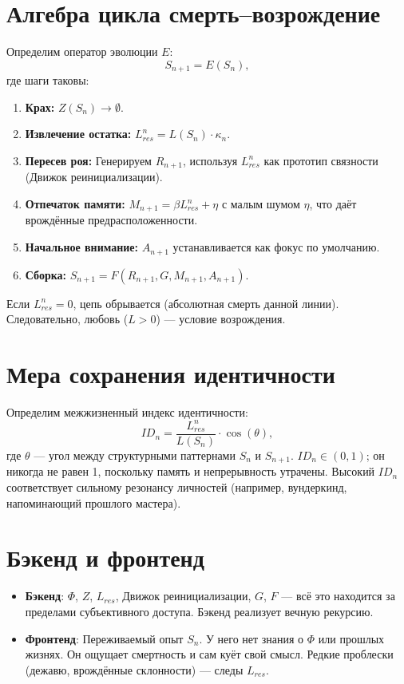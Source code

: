 \documentclass[12pt]{article}
\begin{document}
\section{Алгебра цикла смерть–возрождение}

Определим оператор эволюции $E$:
\[
S_{n+1} = E(S_n),
\]
где шаги таковы:
\begin{enumerate}
\item \textbf{Крах:} $Z(S_n) \to \emptyset$.
\item \textbf{Извлечение остатка:} $L_{res}^n = L(S_n)\cdot \kappa_n$.
\item \textbf{Пересев роя:} Генерируем $R_{n+1}$, используя $L_{res}^n$ как прототип связности (Движок реинициализации).
\item \textbf{Отпечаток памяти:} $M_{n+1} = \beta L_{res}^n + \eta$ с малым шумом $\eta$, что даёт врождённые предрасположенности.
\item \textbf{Начальное внимание:} $A_{n+1}$ устанавливается как фокус по умолчанию.
\item \textbf{Сборка:} $S_{n+1} = F(R_{n+1}, G, M_{n+1}, A_{n+1})$.
\end{enumerate}
Если $L_{res}^n = 0$, цепь обрывается (абсолютная смерть данной линии). Следовательно, любовь ($L>0$) — условие возрождения.

\section{Мера сохранения идентичности}

Определим межжизненный индекс идентичности:
\[
ID_n = \frac{L_{res}^n}{L(S_n)} \cdot \cos(\theta),
\]
где $\theta$ — угол между структурными паттернами $S_n$ и $S_{n+1}$. $ID_n \in (0,1)$; он никогда не равен 1, поскольку память и непрерывность утрачены. Высокий $ID_n$ соответствует сильному резонансу личностей (например, вундеркинд, напоминающий прошлого мастера).

\section{Бэкенд и фронтенд}

\begin{itemize}
\item \textbf{Бэкенд}: $\Phi$, $Z$, $L_{res}$, Движок реинициализации, $G$, $F$ — всё это находится за пределами субъективного доступа. Бэкенд реализует вечную рекурсию.
\item \textbf{Фронтенд}: Переживаемый опыт $S_n$. У него нет знания о $\Phi$ или прошлых жизнях. Он ощущает смертность и сам куёт свой смысл. Редкие проблески (дежавю, врождённые склонности) — следы $L_{res}$.
\end{itemize}
\end{document}
